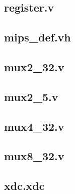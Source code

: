 \documentclass[12pt,a4paper]{article}
\begin{document}
\subsection{register.v}
\begingroup
\footnotesize
\linespread{0.8}\selectfont

\endgroup
\clearpage

\subsection{mips\_def.vh}
\begingroup
\footnotesize
\linespread{0.8}\selectfont

\endgroup
\clearpage

\subsection{mux2\_32.v}
\begingroup
\footnotesize
\linespread{0.8}\selectfont

\endgroup
\clearpage

\subsection{mux2\_5.v}
\begingroup
\footnotesize
\linespread{0.8}\selectfont

\endgroup
\clearpage

\subsection{mux4\_32.v}
\begingroup
\footnotesize
\linespread{0.8}\selectfont

\endgroup
\clearpage

\subsection{mux8\_32.v}
\begingroup
\footnotesize
\linespread{0.8}\selectfont

\endgroup
\clearpage

\subsection{xdc.xdc}
\begingroup
\footnotesize
\linespread{0.8}\selectfont

\endgroup
\clearpage
\end{document}
